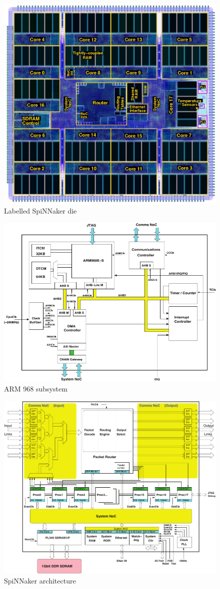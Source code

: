 \documentclass[a4paper, 11pt]{article}
\begin{document}
\begin{figure}[htbp]
	\centering
	\includegraphics[width=0.5\linewidth]{images/spin2_labelled.jpg}
	\caption{Labelled SpiNNaker die}
\end{figure}

\begin{figure}[htbp]
	\centering
	\includegraphics[width=0.8\linewidth]{images/arm968_subsystem.pdf}
	\caption{ARM 968 subsystem}
\end{figure}

\begin{figure}[htbp]
	\centering
	\includegraphics[width=0.8\linewidth]{images/spinnaker_architecture.pdf}
	\caption{SpiNNaker architecture}	
\end{figure}
\end{document}
